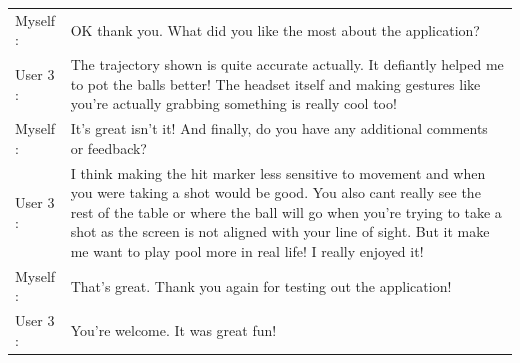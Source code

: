 \documentclass[ %
                author={Finn Alexander Wilkinson},
                supervisor={Dr. Andrew Calway},
                degree={MEng},
                title={\centering A Mixed Reality Aim Assistant for Pool and Snooker},
                subtitle={},
                type={Enterprise},
                year={2021} ]{dissertation}
\begin{document}
\begin{tabular}{l p{130mm}}
    Myself : & OK thank you. What did you like the most about the application? \\
    User 3 : & The trajectory shown is quite accurate actually. It defiantly helped me to pot the balls better! The headset itself and making gestures like you're actually grabbing something is really cool too! \\
    Myself : & It's great isn't it! And finally, do you have any additional comments or feedback? \\
    User 3 : & I think making the hit marker less sensitive to movement and when you were taking a shot would be good. You also cant really see the rest of the table or where the ball will go when you're trying to take a shot as the screen is not aligned with your line of sight. But it make me want to play pool more in real life! I really enjoyed it! \\
    Myself : & That's great. Thank you again for testing out the application! \\
    User 3 : & You're welcome. It was great fun! \\
\end{tabular}
\end{document}
